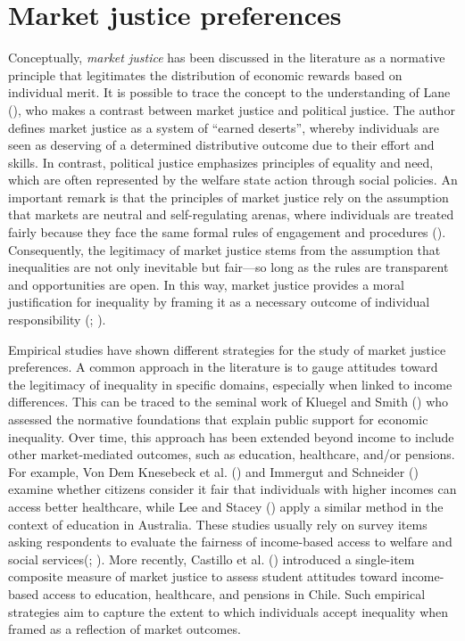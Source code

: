 \documentclass[
  12pt,
]{article}
\begin{document}
\section{Market justice preferences}\label{market-justice-preferences}

Conceptually, \emph{market justice} has been discussed in the literature
as a normative principle that legitimates the distribution of economic
rewards based on individual merit. It is possible to trace the concept
to the understanding of Lane (),
who makes a contrast between market justice and political justice. The
author defines market justice as a system of ``earned deserts'', whereby
individuals are seen as deserving of a determined distributive outcome
due to their effort and skills. In contrast, political justice
emphasizes principles of equality and need, which are often represented
by the welfare state action through social policies. An important remark
is that the principles of market justice rely on the assumption that
markets are neutral and self-regulating arenas, where individuals are
treated fairly because they face the same formal rules of engagement and
procedures (). Consequently,
the legitimacy of market justice stems from the assumption that
inequalities are not only inevitable but fair---so long as the rules are
transparent and opportunities are open. In this way, market justice
provides a moral justification for inequality by framing it as a
necessary outcome of individual responsibility
(;
).

Empirical studies have shown different strategies for the study of
market justice preferences. A common approach in the literature is to
gauge attitudes toward the legitimacy of inequality in specific domains,
especially when linked to income differences. This can be traced to the
seminal work of Kluegel and Smith
() who assessed the normative
foundations that explain public support for economic inequality. Over
time, this approach has been extended beyond income to include other
market-mediated outcomes, such as education, healthcare, and/or
pensions. For example, Von Dem Knesebeck et al.
() and Immergut and
Schneider () examine whether
citizens consider it fair that individuals with higher incomes can
access better healthcare, while Lee and Stacey
() apply a similar method in the
context of education in Australia. These studies usually rely on survey
items asking respondents to evaluate the fairness of income-based access
to welfare and social services(; ). More
recently, Castillo et al.
() introduced a
single-item composite measure of market justice to assess student
attitudes toward income-based access to education, healthcare, and
pensions in Chile. Such empirical strategies aim to capture the extent
to which individuals accept inequality when framed as a reflection of
market outcomes.
\end{document}
